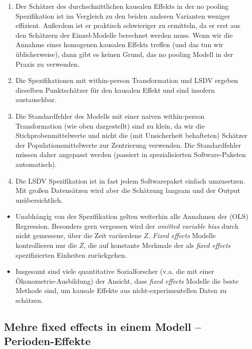 \documentclass[]{book}
\begin{document}
\begin{enumerate}
\def\labelenumi{\arabic{enumi})}
\item
  Der Schätzer des durchschnittlichen kausalen Effekts in der no pooling Spezifikation ist im Vergleich zu den beiden anderen Varianten weniger effizient. Außerdem ist er praktisch schwieriger zu ermitteln, da er erst aus den Schätzern der Einzel-Modelle berechnet werden muss. Wenn wir die Annahme eines homogenen kausalen Effekts treffen (und das tun wir üblicherweise), dann gibt es keinen Grund, das no pooling Modell in der Praxis zu verwenden.
\item
  Die Spezifikationen mit within-person Transformation und LSDV ergeben dieselben Punktschätzer für den kausalen Effekt und sind insofern austauschbar.
\item
  Die Standardfehler des Modells mit einer naiven within-person Transformation (wie oben dargestellt) sind zu klein, da wir die Stichprobenmittelwerte und nicht die (mit Unsicherheit behafteten) Schätzer der Populationsmittelwerte zur Zentrierung verwenden. Die Standardfehler müssen daher angepasst werden (passiert in spezialisierten Software-Paketen automatisch).
\item
  Die LSDV Spezifikation ist in fast jedem Softwarepaket einfach umzusetzen. Mit großen Datensätzen wird aber die Schätzung langsam und der Output unübersichtlich.
\end{enumerate}

\begin{itemize}
\item
  Unabhängig von der Spezifikation gelten weiterhin alle Annahmen der (OLS) Regression. Besonders gern vergessen wird der \emph{omitted variable bias} durch nicht gemessene, über die Zeit variierdene \(Z\). \emph{Fixed effects} Modelle kontrollieren nur die \(Z\), die auf konstante Merkmale der als \emph{fixed effects} spezifizierten Einheiten zurückgehen.
\item
  Insgesamt sind viele quantitative Sozialforscher (v.a. die mit einer Ökonometrie-Ausbildung) der Ansicht, dass \emph{fixed effects} Modelle die beste Methode sind, um kausale Effekte aus nicht-experimentellen Daten zu schätzen.
\end{itemize}

\hypertarget{mehre-fixed-effects-in-einem-modell-perioden-effekte}{%
\subsection{Mehre fixed effects in einem Modell -- Perioden-Effekte}\label{mehre-fixed-effects-in-einem-modell-perioden-effekte}}
\end{document}
